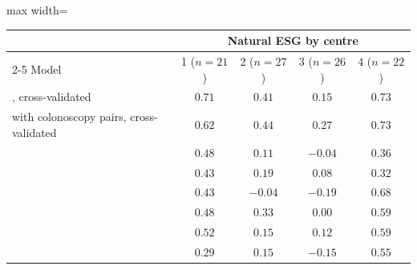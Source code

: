 \begin{table}[!htbp]
\vspace{0.6em}
\begin{adjustbox}{max width=\linewidth}
\begin{tabular}{l cccc}
\toprule
 & \multicolumn{4}{c}{Natural ESG by centre} \\
\cmidrule(lr){2-5}
Model & 1 ($n = 21$) & 2 ($n = 27$) & 3 ($n = 26$) & 4 ($n = 22$) \\
\midrule
\msn{}, cross-validated & $0.71$ & $0.41$ & $0.15$ & $0.73$ \\
\msp{} with colonoscopy pairs, cross-validated & $0.62$ & $0.44$ & $0.27$ & $0.73$ \\
\ms{} & $0.48$ & $0.11$ & $-0.04$ & $0.36$ \\
\msp{} & $0.43$ & $0.19$ & $0.08$ & $0.32$ \\
\base{} & $0.43$ & $-0.04$ & $-0.19$ & $0.68$ \\
\gem{} & $0.48$ & $0.33$ & $0.00$ & $0.59$ \\
\opus{} & $0.52$ & $0.15$ & $0.12$ & $0.59$ \\
\gpt{} & $0.29$ & $0.15$ & $-0.15$ & $0.55$ \\
\bottomrule
\end{tabular}
\end{adjustbox}
\end{table}

